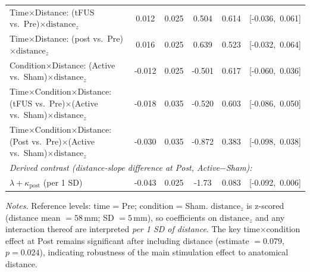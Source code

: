 \begin{table}[t]
\begin{tabular}{lccccc}
    Time$\times$Distance: (tFUS vs.\ Pre)$\times \mathrm{distance}_z$ & 0.012 & 0.025 &  0.504 & 0.614      & [-0.036,\ 0.061] \\
    Time$\times$Distance: (post vs.\ Pre)$\times \mathrm{distance}_z$ & 0.016 & 0.025 &  0.639 & 0.523      & [-0.032,\ 0.064] \\
    Condition$\times$Distance: (Active vs.\ Sham)$\times \mathrm{distance}_z$ & -0.012 & 0.025 & -0.501 & 0.617 & [-0.060,\ 0.036] \\
    Time$\times$Condition$\times$Distance: (tFUS vs.\ Pre)$\times$(Active vs.\ Sham)$\times \mathrm{distance}_z$ & -0.018 & 0.035 & -0.520 & 0.603 & [-0.086,\ 0.050] \\
    Time$\times$Condition$\times$Distance: (Post vs.\ Pre)$\times$(Active vs.\ Sham)$\times \mathrm{distance}_z$ & -0.030 & 0.035 & -0.872 & 0.383 & [-0.098,\ 0.038] \\
    \midrule
    \multicolumn{6}{l}{\textit{Derived contrast (distance-slope difference at Post, Active$-$Sham):}} \\
    \multicolumn{1}{l}{\hspace{1em}$\lambda + \kappa_{\mathrm{post}}$ (per 1 SD)} & \multicolumn{1}{c}{ -0.043} & 0.025 & -1.73 & 0.083 & [-0.092,\ 0.006] \\
    \bottomrule
    \end{tabular}
    
    \vspace{4pt}
\footnotesize\textit{Notes.} Reference levels: time = Pre; condition = Sham. $\mathrm{distance}_z$ is z-scored
(distance mean $=58$\,mm; SD $=5$\,mm), so coefficients on $\mathrm{distance}_z$ and any interaction
thereof are interpreted \emph{per 1 SD of distance}. The key time$\times$condition
effect at Post remains significant after including distance (estimate $=0.079$, $p=0.024$), indicating robustness of the
main stimulation effect to anatomical distance.
\end{table}


